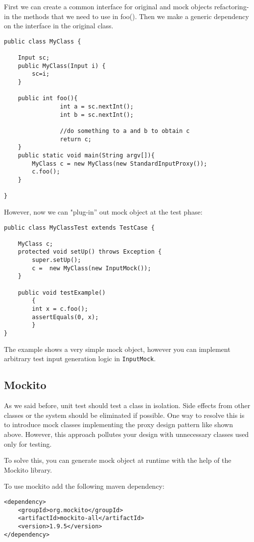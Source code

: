\documentclass{article}
\begin{document}
First we can create a common interface for original and mock objects
refactoring-in the methods that we need to use in foo().
Then we make a generic dependency on the interface in the original class.

\begin{lstlisting}
public class MyClass {

	Input sc;
	public MyClass(Input i) {
		sc=i;
	}

	public int foo(){
                int a = sc.nextInt();
                int b = sc.nextInt();
		
                //do something to a and b to obtain c
                return c;
	}
	public static void main(String argv[]){
		MyClass c = new MyClass(new StandardInputProxy());
		c.foo();
	}	
	
}
\end{lstlisting}

However, now we can "plug-in'' out mock object at the test phase:

\begin{lstlisting}
public class MyClassTest extends TestCase {

	MyClass c;
	protected void setUp() throws Exception {
		super.setUp();
		c =  new MyClass(new InputMock());
	}
	
	public void testExample()
        {
		int x = c.foo();
		assertEquals(0, x);
        }
}
\end{lstlisting}


The example shows a very simple mock object, however you can implement
arbitrary test input generation logic in \texttt{InputMock}.

\subsection{Mockito}

As we said before, unit test should test a class in isolation. Side
effects from other classes or the system should be eliminated if
possible. 
One way to resolve this is to introduce mock classes implementing
the proxy design pattern like shown above. However, this approach
pollutes your design with unnecessary classes used only for testing.

To solve this, you can generate mock object at runtime with the help
of the Mockito library. 

To use mockito add the following maven dependency:

\begin{lstlisting}
<dependency>
	<groupId>org.mockito</groupId>
	<artifactId>mockito-all</artifactId>
	<version>1.9.5</version>
</dependency>
\end{lstlisting}
\end{document}

